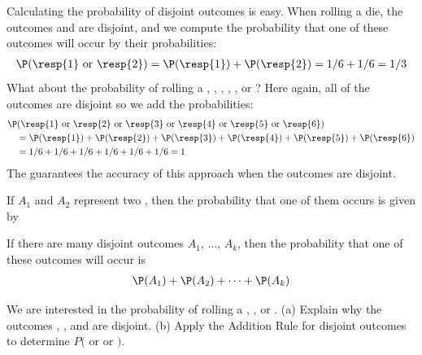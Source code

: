 \documentclass{ccg-topic}
\begin{document}
Calculating the probability of disjoint outcomes is easy. When rolling a die, the outcomes  and  are disjoint, and we compute the probability that one of these outcomes will occur by  their  probabilities:
\begin{align*}
\P(\text{\resp{1} or \resp{2}})
  = \P(\text{\resp{1}})+\P(\text{\resp{2}})
  = 1/6 + 1/6
  = 1/3
\end{align*}
What about  the probability of rolling a , , , , , or ? Here again, all of the outcomes are disjoint so we add the probabilities:
\begin{align*}
&\P(\text{\resp{1} or \resp{2} or \resp{3} or \resp{4}
    or \resp{5} or \resp{6}}) \\
  &\quad = \P(\text{\resp{1}})+\P(\text{\resp{2}})
      + \P(\text{\resp{3}})+\P(\text{\resp{4}})
      + \P(\text{\resp{5}})+\P(\text{\resp{6}}) \\
  &\quad = 1/6 + 1/6 + 1/6 + 1/6 + 1/6 + 1/6
  = 1
\end{align*}
The  guarantees the accuracy of this approach when the outcomes are disjoint. 

\begin{defn}
  If $A_1$ and $A_2$ represent two ,
  then the probability that one of them occurs is given by
  \begin{center}
  \end{center}
  If there are many disjoint outcomes $A_1$, ..., $A_k$,
  then the probability that one of these outcomes will occur is
  \begin{align*}
  \P(A_1) + \P(A_2) + \cdots + \P(A_k)
  \end{align*}
\end{defn}


\begin{todo}
We are interested in the probability of rolling a , , or . (a) Explain why the outcomes , , and  are disjoint. (b) Apply the Addition Rule for disjoint outcomes to determine $P($ or  or $)$.\footnotemark
\end{todo}
\end{document}
